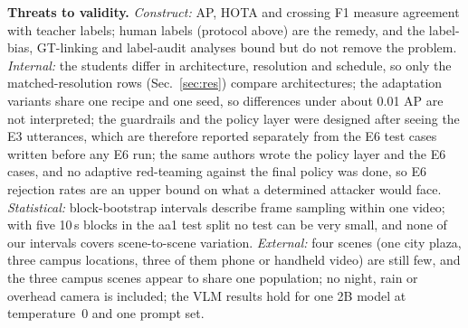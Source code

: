\textbf{Threats to validity.} \emph{Construct:} AP, HOTA and crossing F1 measure agreement with teacher labels;
human labels (protocol above) are the remedy, and the label-bias, GT-linking and label-audit analyses bound but do
not remove the problem. \emph{Internal:} the students differ in architecture, resolution and schedule, so only the
matched-resolution rows (Sec.~\ref{sec:res}) compare architectures; the adaptation variants share one recipe and one
seed, so differences under about 0.01 AP are not interpreted; the guardrails and the policy layer were designed
after seeing the E3 utterances, which are therefore reported separately from the E6 test cases written before any
E6 run; the same authors wrote the policy layer and the E6 cases, and no adaptive red-teaming against the final
policy was done, so E6 rejection rates are an upper bound on what a determined attacker would face. \emph{Statistical:} block-bootstrap intervals describe frame sampling within one video; with five 10\,s
blocks in the aa1 test split no test can be very small, and none of our intervals covers scene-to-scene variation.
\emph{External:} four scenes (one city plaza, three campus locations, three of them phone or handheld video) are
still few, and the three campus scenes appear to share one population; no night, rain or overhead camera is included; the
VLM results hold for one 2B model at temperature~0 and one prompt set.
